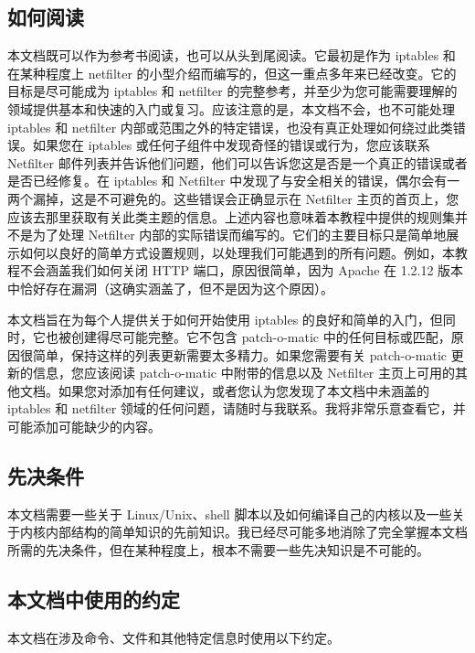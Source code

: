 \documentclass[12pt,UTF8]{ctexbook}
\begin{document}
\subsection{如何阅读}
本文档既可以作为参考书阅读，也可以从头到尾阅读。它最初是作为 iptables 和在某种程度上 netfilter 的小型介绍而编写的，但这一重点多年来已经改变。它的目标是尽可能成为 iptables 和 netfilter 的完整参考，并至少为您可能需要理解的领域提供基本和快速的入门或复习。应该注意的是，本文档不会，也不可能处理 iptables 和 netfilter 内部或范围之外的特定错误，也没有真正处理如何绕过此类错误。如果您在 iptables 或任何子组件中发现奇怪的错误或行为，您应该联系 Netfilter 邮件列表并告诉他们问题，他们可以告诉您这是否是一个真正的错误或者是否已经修复。在 iptables 和 Netfilter 中发现了与安全相关的错误，偶尔会有一两个漏掉，这是不可避免的。这些错误会正确显示在 Netfilter 主页的首页上，您应该去那里获取有关此类主题的信息。上述内容也意味着本教程中提供的规则集并不是为了处理 Netfilter 内部的实际错误而编写的。它们的主要目标只是简单地展示如何以良好的简单方式设置规则，以处理我们可能遇到的所有问题。例如，本教程不会涵盖我们如何关闭 HTTP 端口，原因很简单，因为 Apache 在 1.2.12 版本中恰好存在漏洞（这确实涵盖了，但不是因为这个原因）。

本文档旨在为每个人提供关于如何开始使用 iptables 的良好和简单的入门，但同时，它也被创建得尽可能完整。它不包含 patch-o-matic 中的任何目标或匹配，原因很简单，保持这样的列表更新需要太多精力。如果您需要有关 patch-o-matic 更新的信息，您应该阅读 patch-o-matic 中附带的信息以及 Netfilter 主页上可用的其他文档。如果您对添加有任何建议，或者您认为您发现了本文档中未涵盖的 iptables 和 netfilter 领域的任何问题，请随时与我联系。我将非常乐意查看它，并可能添加可能缺少的内容。

\subsection{先决条件}
本文档需要一些关于 Linux/Unix、shell 脚本以及如何编译自己的内核以及一些关于内核内部结构的简单知识的先前知识。我已经尽可能多地消除了完全掌握本文档所需的先决条件，但在某种程度上，根本不需要一些先决知识是不可能的。

\subsection{本文档中使用的约定}
本文档在涉及命令、文件和其他特定信息时使用以下约定。
\end{document}
